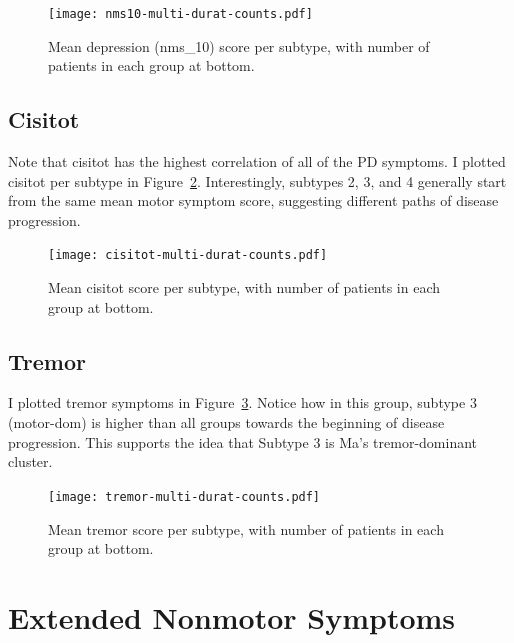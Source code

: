 \documentclass[10pt]{article}
\begin{document}
\begin{multicols}{2}
\begin{figure}[p]
  \centering
  \texttt{[image: nms10-multi-durat-counts.pdf]}
  \caption{Mean depression (nms\_10) score per subtype, with number of patients in each group at
  bottom.}
  \label{fig:nms10-multi}
\end{figure}

\subsection{Cisitot}

Note that cisitot has the highest correlation of all of the PD symptoms. I plotted cisitot per
subtype in Figure~\ref{fig:cisitot-multi}. Interestingly, subtypes 2, 3, and 4 generally start from
the same mean motor symptom score, suggesting different paths of disease progression.

\begin{figure}[t]
  \centering
  \texttt{[image: cisitot-multi-durat-counts.pdf]}
  \caption{Mean cisitot score per subtype, with number of patients in each group at
  bottom.}
  \label{fig:cisitot-multi}
\end{figure}

\subsection{Tremor}

I plotted tremor symptoms in Figure~\ref{fig:tremor-multi}. Notice how in this group, subtype 3
(motor-dom) is higher than all groups towards the beginning of disease progression. This supports
the idea that Subtype 3 is Ma's \cite{ma15} tremor-dominant cluster.

\begin{figure}[t]
  \centering
  \texttt{[image: tremor-multi-durat-counts.pdf]}
  \caption{Mean tremor score per subtype, with number of patients in each group at
  bottom.}
  \label{fig:tremor-multi}
\end{figure}


\section{Extended Nonmotor Symptoms}
\label{sec:nms30}


\end{multicols}
\end{document}
